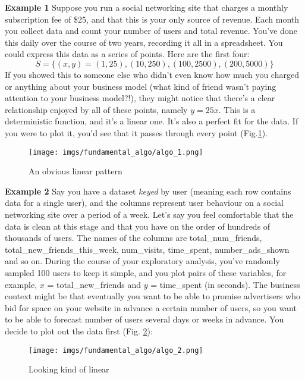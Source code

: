 \textbf{Example 1} Suppose you run a social networking site that charges a monthly subscription fee of \$25, and that this is your only source of revenue. Each month you collect data and count your number of users and total revenue. You’ve done this daily over the course of two years, recording it all in a spreadsheet. You could express this data as a series of points. Here are the first four:
$$
    S=\{(x, y)=(1,25),(10,250),(100,2500),(200,5000)\}
$$
If you showed this to someone else who didn't even know how much you charged or anything about your business model (what kind of friend wasn't paying attention to your business model?!), they might notice that there's a clear relationship enjoyed by all of these points, namely \(y=25x\). This is a deterministic function, and it’s a linear one. It's also a perfect fit for the data. If you were to plot it, you'd see that it passes through every point (Fig.\ref{fig:algo_1}).

\begin{figure}[H]
    \centering
    \texttt{[image: imgs/fundamental\_algo/algo\_1.png]}
    \caption{An obvious linear pattern}
    \label{fig:algo_1}
\end{figure}

\textbf{Example 2} Say you have a dataset \textit{keyed} by user (meaning each row contains data for a single user), and the columns represent user behaviour on a social networking site over a period of a week. Let's say you feel comfortable that the data is clean at this stage and that you have on the order of hundreds of thousands of users. The names of the columns are total\_num\_friends, total\_new\_friends\_this\_week, num\_visits, time\_spent, number\_ads\_shown and so on. During the course of your exploratory analysis, you've randomly sampled 100 users to keep it simple, and you plot pairs of these variables, for example, \(x\) = total\_new\_friends and \(y\) = time\_spent (in seconds). The business context might be that eventually you want to be able to promise advertisers who bid for space on your website in advance a certain number of users, so you want to be able to forecast number of users several days or weeks in advance. You decide to plot out the data first (Fig. \ref{fig:algo_2}):

\begin{figure}[H]
    \centering
    \texttt{[image: imgs/fundamental\_algo/algo\_2.png]}
    \caption{Looking kind of linear}
    \label{fig:algo_2}
\end{figure}


